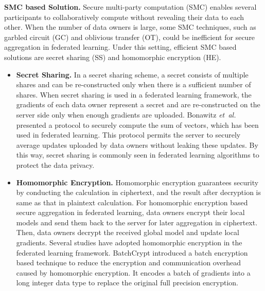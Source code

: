\documentclass[11pt]{article}
\newcommand{\etal}{\textit{et~al.}\xspace}
\newcommand{\fakeparagraph}[1]{\vspace{1mm}\noindent\textbf{#1.}}
\begin{document}
\fakeparagraph{SMC based Solution}
Secure multi-party computation (SMC) enables several participants to collaboratively compute without revealing their data to each other. 
When the number of data owners is large, some SMC techniques, such as garbled circuit (GC) and oblivious transfer (OT), could be inefficient for secure aggregation in federated learning. 
Under this setting, efficient SMC based solutions are secret sharing (SS) and homomorphic encryption (HE).
\begin{itemize}
    \item \textbf{Secret Sharing.}
    In a secret sharing scheme, a secret consists of multiple shares and can be re-constructed only when there is a sufficient number of shares. 
    When secret sharing is used in a federated learning framework, the gradients of each data owner represent a secret and are re-constructed on the server side only when enough gradients are uploaded.
    Bonawitz \etal \cite{DBLP:conf/ccs/BonawitzIKMMPRS17} presented a protocol to securely compute the sum of vectors, which has been used in federated learning. 
	This protocol permits the server to securely average updates uploaded by data owners without leaking these updates.
    By this way, secret sharing is commonly seen in federated learning algorithms \cite{DBLP:conf/icics/DongCSW19, DBLP:journals/tifs/XuLL0L20, DBLP:conf/bigdataconf/SharmaXLK19} to protect the data privacy.
	
    \item \textbf{Homomorphic Encryption.}
    Homomorphic encryption guarantees security by conducting the calculation in ciphertext, and the result after decryption is same as that in plaintext calculation. 
	For homomorphic encryption based secure aggregation in federated learning, data owners encrypt their local models and send them back to the server for later aggregation in ciphertext. Then, data owners decrypt the received global model and update local gradients. 
    Several studies \cite{DBLP:journals/tifs/PhongAHWM18, DBLP:conf/globecom/ZhangCYD19, DBLP:journals/expert/ChenQWYG20, zhangtkde23} have adopted homomorphic encryption in the federated learning framework. 
    \textsf{BatchCrypt} \cite{DBLP:conf/usenix/ZhangLX00020} introduced a batch encryption based technique to reduce the encryption and communication overhead caused by homomorphic encryption. It encodes a batch of gradients into a long integer data type to replace the original full precision encryption.
\end{itemize}
\end{document}
